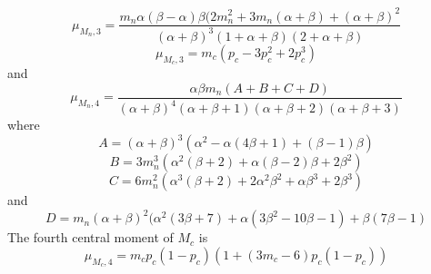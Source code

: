 \documentclass{article}
\begin{document}
\begin{appendices}
{\begin{equation}
    \mu_{M_n,3}=\frac{m_n\alpha(\beta-\alpha)\beta(2m_n^2+3m_n(\alpha+\beta)+(\alpha+\beta)^2}{(\alpha+\beta)^3(1+\alpha+\beta)(2+\alpha+\beta)}
\end{equation}
\begin{equation}
    \mu_{M_c,3}=m_c(p_c-3p_c^2+2p_c^3)
\end{equation}
and
\begin{equation}
    \mu_{M_n,4}=\frac{\alpha\beta m_n(A+B+C+D)}{(\alpha +\beta )^4 (\alpha +\beta +1) (\alpha +\beta +2) (\alpha +\beta +3)}
\end{equation}
where
\begin{equation*}
    A = (\alpha +\beta )^3 \left(\alpha ^2-\alpha  (4 \beta +1)+(\beta -1) \beta \right)
\end{equation*}
\begin{equation*}
    B = 3m_n^3\left(\alpha ^2 (\beta +2)+\alpha  (\beta -2) \beta +2 \beta ^2\right)
\end{equation*}
\begin{equation*}
    C = 6m_n^2\left(\alpha ^3 (\beta +2)+2 \alpha ^2 \beta ^2+\alpha  \beta ^3+2 \beta ^3\right)
\end{equation*}
and
\begin{equation*}
    D = m_n(\alpha +\beta )^2(\alpha ^2 (3 \beta +7)+\alpha  (3 \beta ^2-10 \beta -1)+\beta  (7 \beta -1)
\end{equation*}
The fourth central moment of $M_c$ is
\begin{equation}
    \mu_{M_c,4}=m_cp_c(1-p_c)(1+(3m_c-6)p_c(1-p_c))
\end{equation}

}
\end{appendices}
\end{document}
